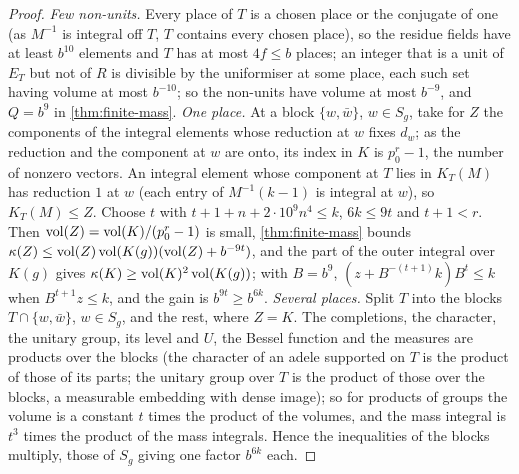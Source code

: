 \begin{proof}
\emph{Few non-units.} Every place of $T$ is a chosen place or the conjugate of one (as $M^{-1}$ is integral off $T$, $T$ contains every chosen place), so the residue fields have at least $b^{10}$ elements and $T$ has at most $4f\le b$ places; an integer
that is a unit of $E_T$ but not of $R$ is divisible by the uniformiser at some place, each such set having volume at most $b^{-10}$; so the non-units have volume at most $b^{-9}$, and $Q=b^9$ in \cref{thm:finite-mass}. \emph{One place.} At a block
$\{w,\bar w\}$, $w\in S_g$, take for $Z$ the components of the integral elements whose reduction at $w$ fixes $d_w$; as the reduction and the component at $w$ are onto, its index in $K$ is $p_0^r-1$, the number of nonzero vectors. An integral
element whose component at $T$ lies in $K_T(M)$ has reduction $1$ at $w$ (each entry of $M^{-1}(k-1)$ is integral at $w$), so $K_T(M)\le Z$. Choose $t$ with $t+1+n+2\cdot10^9n^4\le k$, $6k\le9t$ and $t+1<r$. Then $\operatorname{vol}(Z)=\operatorname{vol}(K)/(p_0^r-1)$ is small,
\cref{thm:finite-mass} bounds $\kappa(Z)\le\operatorname{vol}(Z)\operatorname{vol}(K(g))(\operatorname{vol}(Z)+b^{-9t})$, and the part of the outer integral over $K(g)$ gives $\kappa(K)\ge\operatorname{vol}(K)^2\operatorname{vol}(K(g))$; with $B=b^9$, $(z+B^{-(t+1)}k)B^t\le k$ when $B^{t+1}z\le k$, and the gain is
$b^{9t}\ge b^{6k}$. \emph{Several places.} Split $T$ into the blocks $T\cap\{w,\bar w\}$, $w\in S_g$, and the rest, where $Z=K$. The completions, the character, the unitary group, its level and $U$, the Bessel function and the measures are products
over the blocks (the character of an adele supported on $T$ is the product of those of its parts; the unitary group over $T$ is the product of those over the blocks, a measurable embedding with dense image); so for products of groups the volume
is a constant $t$ times the product of the volumes, and the mass integral is $t^3$ times the product of the mass integrals. Hence the inequalities of the blocks multiply, those of $S_g$ giving one factor $b^{6k}$ each.
\end{proof}

